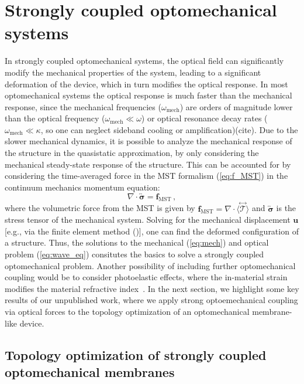 \section{Strongly coupled optomechanical systems~\cite{ownpub5}}\label{sec:mech_strongly_coupled}

In strongly coupled optomechanical systems, the optical field can significantly modify the mechanical properties of the system, leading to a significant deformation
of the device, which in turn modifies the optical response. In most optomechanical systems the optical response is much faster than the mechanical response, since the 
mechanical frequencies ($\omega_\text{mech}$) are orders of magnitude lower than the optical frequency ($\omega_\text{mech}\ll\omega$) or optical resonance decay rates ($\omega_\text{mech}\ll\kappa$, so one 
can neglect sideband cooling or amplification)\cite{opto_crys, photo_topopt}(cite). Due to the slower mechanical dynamics, it is possible to analyze the mechanical response of the structure in the quasistatic approximation, by only considering the mechanical steady-state response of the structure. 
This can be accounted for by considering the time-averaged force in the MST formalism (\eqref{eq:f_MST}) in the continuum mechanics momentum equation:
\begin{equation}\label{eq:mech}
    \nabla \cdot \overleftrightarrow{\boldsymbol{\sigma}} = \mathbf{f}_\text{MST}  \,,
\end{equation}
where the volumetric force from the MST is given by $ \mathbf{f}_\text{MST} = \nabla \cdot \langle \stackrel{\leftrightarrow}{\bm{\mathcal{T}}} \rangle$ and $\overleftrightarrow{\boldsymbol{\sigma}}$ is the stress tensor of the mechanical system. Solving for the mechanical
displacement $\mathbf{u}$ [e.g., via the finite element method ()], one can find the deformed configuration of a structure. Thus, the solutions to the mechanical (\eqref{eq:mech}) and optical problem
(\eqref{eq:wave_eq}) consitutes the basics to solve a strongly coupled optomechanical problem. Another possibility of including further optomechanical coupling would be to consider
photoelastic effects, where the in-material strain modifies the material refractive index~\cite{photoelasticity}.  In the next section, we highlight some key results of our unpublished work, where we apply strong optoemechanical coupling
via optical forces to the 
topology optimization of an optomechanical membrane-like device.

\subsection*{Topology optimization of strongly coupled optomechanical membranes}

